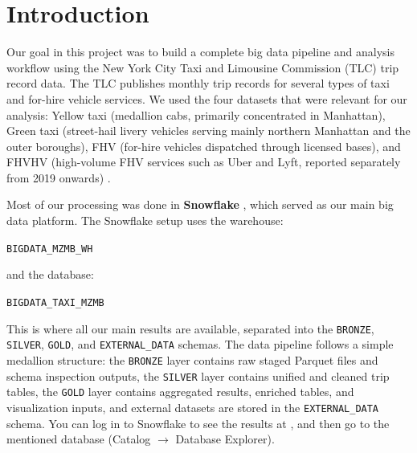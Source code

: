 \documentclass[fleqn,moreauthors,9pt]{ds_report}
\begin{document}
\flushbottom
\maketitle



\section*{Introduction}

Our goal in this project was to build a complete big data pipeline and analysis workflow using the New York City Taxi and Limousine Commission (TLC) trip record data. The TLC publishes monthly trip records for several types of taxi and for-hire vehicle services. We used the four datasets that were relevant for our analysis: Yellow taxi (medallion cabs, primarily concentrated in Manhattan), Green taxi (street-hail livery vehicles serving mainly northern Manhattan and the outer boroughs), FHV (for-hire vehicles dispatched through licensed bases), and FHVHV (high-volume FHV services such as Uber and Lyft, reported separately from 2019 onwards) \cite{tlc2024data}.

Most of our processing was done in \textbf{Snowflake} \cite{snowflake2024}, which served as our main big data platform. The Snowflake setup uses the warehouse:

\begin{center}
\texttt{BIGDATA\_MZMB\_WH}
\end{center}

and the database:

\begin{center}
\texttt{BIGDATA\_TAXI\_MZMB}
\end{center}

This is where all our main results are available, separated into the \texttt{BRONZE}, \texttt{SILVER}, \texttt{GOLD}, and \texttt{EXTERNAL\_DATA} schemas. The data pipeline follows a simple medallion structure: the \texttt{BRONZE} layer contains raw staged Parquet files and schema inspection outputs, the \texttt{SILVER} layer contains unified and cleaned trip tables, the \texttt{GOLD} layer contains aggregated results, enriched tables, and visualization inputs, and external datasets are stored in the \texttt{EXTERNAL\_DATA} schema. You can log in to Snowflake to see the results at \textbf{}, and then go to the mentioned database (Catalog $\to$ Database Explorer).
\end{document}
